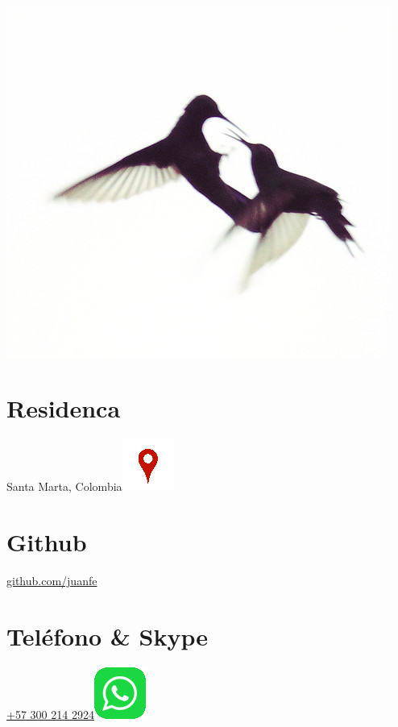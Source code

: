\begin{aside}
    ~
    ~
    ~
    ~
    ~
    ~
  \includegraphics[scale=0.8]{img/coruscan.jpg}
    ~
  \section{Residenca}
    Santa Marta, Colombia\href{https://www.google.com/maps/place/Santa+Marta,+Magdalena/@11.2315666,-74.2030395,14}{\includegraphics[scale=0.15]{img/ubicacion.png}}
    ~
    ~
  \section{Github}
    \href{https://github.com/juanfe}{github.com/juanfe}
  \section{Teléfono \& Skype}
    \href{callto:+573002142924}{+57 300 214 2924\includegraphics[scale=0.15]{img/whatsapp.png}}
    ~
    ~

\end{aside}
